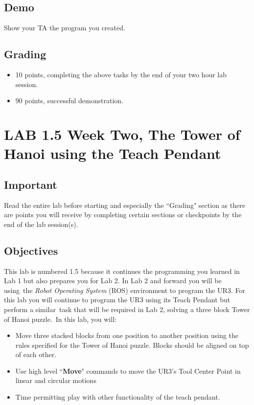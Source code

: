 \subsection{Demo}
Show your TA the program you created.  

\subsection{Grading}
\begin{itemize}
\item 10 points, completing the above tasks by the end of your two hour lab session.
\item 90 points, successful demonstration.
\end{itemize}
\pagebreak
\section{LAB 1.5 Week Two, The Tower of Hanoi using the Teach Pendant}
\subsection{Important}
Read the entire lab before starting and especially the ``Grading" section as there are points you will receive by completing certain sections or checkpoints
by the end of the lab session(s). 
\subsection{Objectives}
This lab is numbered 1.5 because it continues the programming you learned in Lab 1 but also prepares you for Lab 2.  In Lab 2 and forward you will be using\
the \textit{Robot Operating System} (ROS) environment to program the UR3.  For this lab you will continue to program the UR3 using its Teach Pendant but perform a similar\ 
task that will be required in Lab 2, solving a three block Tower of Hanoi puzzle.\
In this lab, you will:
\begin{itemize}
\item Move three stacked blocks from one position to another position using the rules specified for the Tower of Hanoi puzzle.  Blocks should be aligned on top
of each other.
\item Use high level ``\textbf{Move}" commands to move the UR3's Tool Center Point in linear and circular motions
\item Time permitting play with other functionality of the teach pendant.
\end{itemize}

